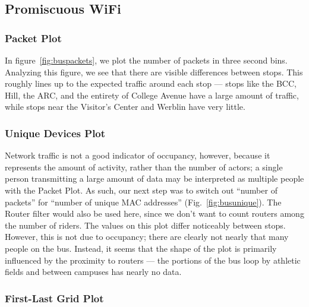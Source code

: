 \subsection{Promiscuous WiFi}

\subsubsection*{Packet Plot}

In figure~\ref{fig:buspackets}, we plot the number of packets in three second bins.
Analyzing this figure, we see that there are visible differences between stops.
This roughly lines up to the expected traffic around each stop --- stops like the BCC, Hill, the ARC, and the entirety of College Avenue have a large amount of traffic, while stops near the Visitor's Center and Werblin have very little.

\subsubsection*{Unique Devices Plot}

Network traffic is not a good indicator of occupancy, however, because it represents the amount of activity, rather than the number of actors; a single person transmitting a large amount of data may be interpreted as multiple people with the Packet Plot.
As such, our next step was to switch out ``number of packets'' for ``number of unique MAC addresses'' (Fig.~\ref{fig:busunique}).
The Router filter would also be used here, since we don't want to count routers among the number of riders.
The values on this plot differ noticeably between stops.
However, this is not due to occupancy; there are clearly not nearly that many people on the bus.
Instead, it seems that the shape of the plot is primarily influenced by the proximity to routers --- the portions of the bus loop by athletic fields and between campuses has nearly no data.

\subsubsection*{First-Last Grid Plot}

